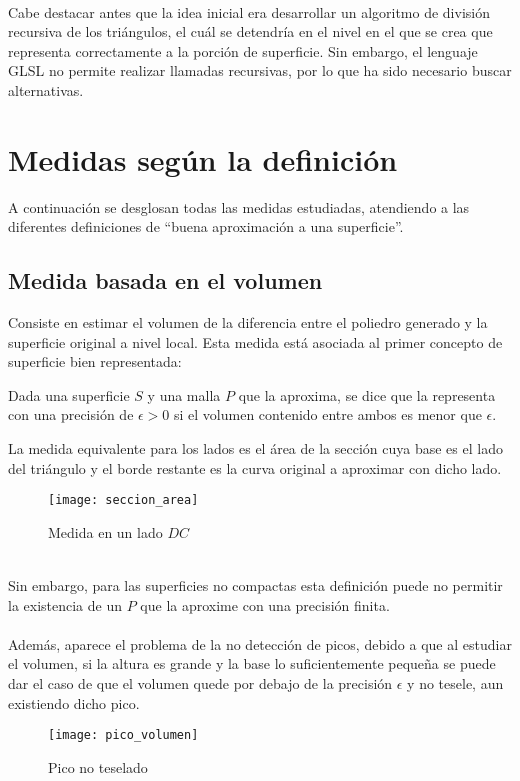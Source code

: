 \\ Cabe destacar antes que la idea inicial era desarrollar un algoritmo de división recursiva de los triángulos, el cuál se detendría en el nivel en el que se crea que representa correctamente a la porción de superficie. Sin embargo, el lenguaje GLSL no permite realizar llamadas recursivas, por lo que ha sido necesario buscar alternativas.\\


\section{Medidas según la definición}

	A continuación se desglosan todas las medidas estudiadas, atendiendo a las diferentes definiciones de ``buena aproximación a una superficie''.

	\subsection*{Medida basada en el volumen}
	
	Consiste en estimar el volumen de la diferencia entre el poliedro generado y la superficie original a nivel local. Esta medida está asociada al primer concepto de superficie bien representada:
	\begin{definicion}
		Dada una superficie $S$ y una malla $P$ que la aproxima, se dice que la representa con una precisión de $\epsilon > 0$ si el volumen contenido entre ambos es menor que $\epsilon$.
	\end{definicion}
	La medida equivalente para los lados es el área de la sección cuya base es el lado del triángulo y el borde restante es la curva original a aproximar con dicho lado.\\ 
	\begin{figure}[h]
  		\centering
  		\texttt{[image: seccion\_area]}
  		\caption{Medida en un lado $DC$}
  		\label{fig:seccion_area}
	\end{figure}
	\\ Sin embargo, para las superficies no compactas esta definición puede no permitir la existencia de un $P$ que la aproxime con una precisión finita.\\
	\\ Además, aparece el problema de la no detección de picos, debido a que al estudiar el volumen, si la altura es grande y la base lo suficientemente pequeña se puede dar el caso de que el volumen quede por debajo de la precisión $\epsilon$ y no tesele, aun existiendo dicho pico.
	\begin{figure}[h]
  		\centering
  		\texttt{[image: pico\_volumen]}
  		\caption{Pico no teselado}
  		\label{fig:pico_volumen}
	\end{figure}
	
